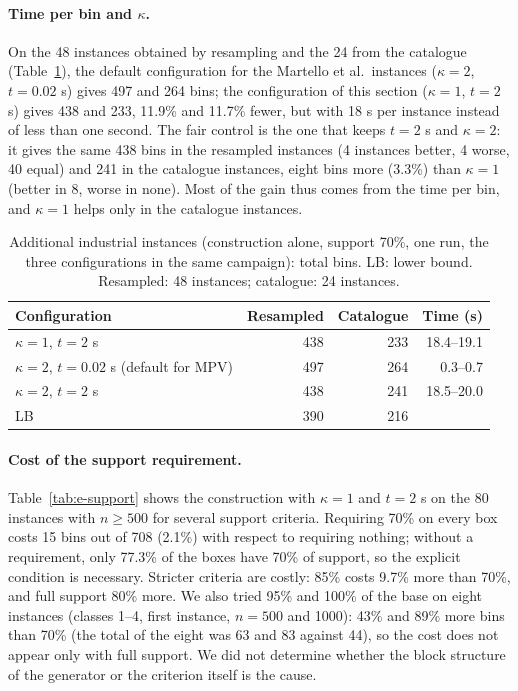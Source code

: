 \paragraph{Time per bin and $\kappa$.}
On the 48 instances obtained by resampling and the 24 from the catalogue (Table~\ref{tab:e-indnew}), the default configuration for the Martello et al.\ instances ($\kappa=2$, $t=0.02$ s) gives 497 and 264 bins; the
configuration of this section ($\kappa=1$, $t=2$ s) gives 438 and 233, 11.9\% and 11.7\% fewer, but with 18 s per instance instead of less than one second. The fair control is the one that keeps $t=2$ s and
$\kappa=2$: it gives the same 438 bins in the resampled instances (4 instances better, 4 worse, 40 equal) and 241 in the catalogue instances, eight bins more (3.3\%) than $\kappa=1$ (better in 8, worse in none). Most of the gain thus
comes from the time per bin, and $\kappa=1$ helps only in the catalogue instances.

\begin{table}[t]
\centering
\small\setlength{\tabcolsep}{4pt}
\caption{Additional industrial instances (construction alone, support 70\%, one run, the three configurations in the same campaign): total bins. LB: lower bound. Resampled: 48 instances; catalogue: 24 instances.}
\label{tab:e-indnew}
\begin{tabular}{@{}lrrr@{}}
\toprule
Configuration & Resampled & Catalogue & Time (s)\\
\midrule
$\kappa=1$, $t=2$ s & 438 & 233 & 18.4--19.1\\
$\kappa=2$, $t=0.02$ s (default for MPV) & 497 & 264 & 0.3--0.7\\
$\kappa=2$, $t=2$ s & 438 & 241 & 18.5--20.0\\
LB & 390 & 216 & \\
\bottomrule
\end{tabular}
\end{table}

\paragraph{Cost of the support requirement.}
Table~\ref{tab:e-support} shows the construction with $\kappa=1$ and $t=2$ s on the 80 instances with $n\ge 500$ for several support criteria. Requiring 70\% on every box costs 15 bins out of 708 (2.1\%) with respect to requiring nothing; without a requirement, only 77.3\% of
the boxes have 70\% of support, so the explicit condition is necessary. Stricter criteria are costly: 85\% costs 9.7\% more than 70\%, and full support 80\% more. We
also tried 95\% and 100\% of the base on eight instances (classes 1--4, first instance, $n=500$ and 1000): 43\% and 89\% more bins than 70\% (the total of the eight was 63 and 83 against 44), so the cost does not appear only with full support. We did not determine whether the block structure of the
generator or the criterion itself is the cause.

